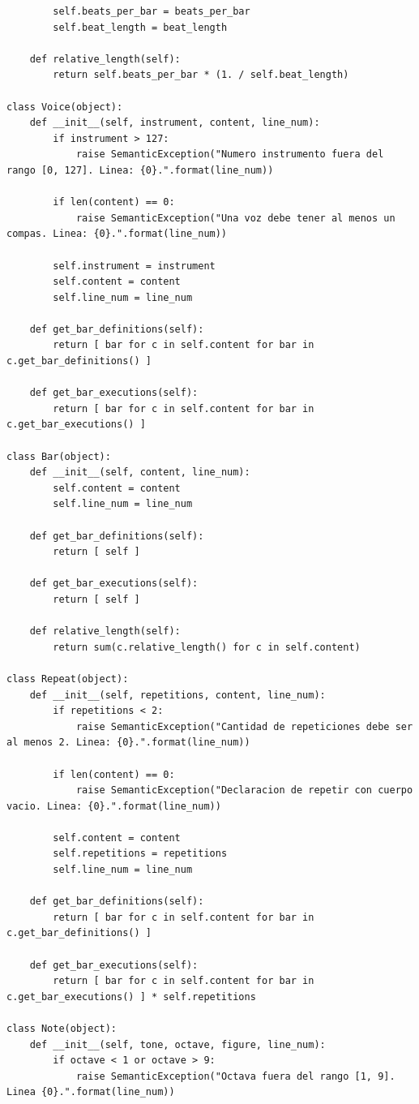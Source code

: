 \documentclass[a4paper, 10pt, twoside]{article}
\begin{document}
\begin{verbatim}
        self.beats_per_bar = beats_per_bar
        self.beat_length = beat_length

    def relative_length(self):
        return self.beats_per_bar * (1. / self.beat_length)

class Voice(object):
    def __init__(self, instrument, content, line_num):
        if instrument > 127:
            raise SemanticException("Numero instrumento fuera del rango [0, 127]. Linea: {0}.".format(line_num))

        if len(content) == 0:
            raise SemanticException("Una voz debe tener al menos un compas. Linea: {0}.".format(line_num))

        self.instrument = instrument
        self.content = content
        self.line_num = line_num

    def get_bar_definitions(self):
        return [ bar for c in self.content for bar in c.get_bar_definitions() ]

    def get_bar_executions(self):
        return [ bar for c in self.content for bar in c.get_bar_executions() ]

class Bar(object):
    def __init__(self, content, line_num):
        self.content = content
        self.line_num = line_num

    def get_bar_definitions(self):
        return [ self ]

    def get_bar_executions(self):
        return [ self ]

    def relative_length(self):
        return sum(c.relative_length() for c in self.content)

class Repeat(object):
    def __init__(self, repetitions, content, line_num):
        if repetitions < 2:
            raise SemanticException("Cantidad de repeticiones debe ser al menos 2. Linea: {0}.".format(line_num))

        if len(content) == 0:
            raise SemanticException("Declaracion de repetir con cuerpo vacio. Linea: {0}.".format(line_num))
        
        self.content = content
        self.repetitions = repetitions
        self.line_num = line_num

    def get_bar_definitions(self):
        return [ bar for c in self.content for bar in c.get_bar_definitions() ]

    def get_bar_executions(self):
        return [ bar for c in self.content for bar in c.get_bar_executions() ] * self.repetitions

class Note(object):
    def __init__(self, tone, octave, figure, line_num):
        if octave < 1 or octave > 9:
            raise SemanticException("Octava fuera del rango [1, 9]. Linea {0}.".format(line_num))
        

\end{verbatim}
\end{document}
